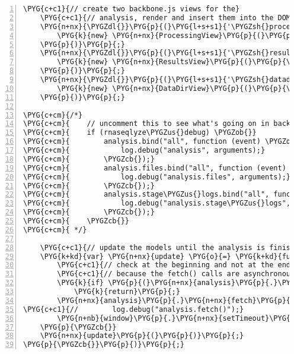 \begin{Verbatim}[commandchars=\\\{\},numbers=left,firstnumber=1,stepnumber=5]
    \PYG{c+c1}{// create two backbone.js views for the}
    \PYG{c+c1}{// analysis, render and insert them into the DOM}
    \PYG{n+nx}{\PYGZdl{}}\PYG{p}{(}\PYG{l+s+s1}{'\PYGZsh{}processing'}\PYG{p}{)}\PYG{p}{.}\PYG{n+nx}{html}\PYG{p}{(}
        \PYG{k}{new} \PYG{n+nx}{ProcessingView}\PYG{p}{(}\PYG{p}{\PYGZob{}}\PYG{n+nx}{model}\PYG{o}{:} \PYG{n+nx}{analysis}\PYG{p}{\PYGZcb{}}\PYG{p}{)}\PYG{p}{.}\PYG{n+nx}{render}\PYG{p}{(}\PYG{p}{)}\PYG{p}{.}\PYG{n+nx}{el}
    \PYG{p}{)}\PYG{p}{;}
    \PYG{n+nx}{\PYGZdl{}}\PYG{p}{(}\PYG{l+s+s1}{'\PYGZsh{}results'}\PYG{p}{)}\PYG{p}{.}\PYG{n+nx}{html}\PYG{p}{(}
        \PYG{k}{new} \PYG{n+nx}{ResultsView}\PYG{p}{(}\PYG{p}{\PYGZob{}}\PYG{n+nx}{model}\PYG{o}{:} \PYG{n+nx}{analysis}\PYG{p}{\PYGZcb{}}\PYG{p}{)}\PYG{p}{.}\PYG{n+nx}{render}\PYG{p}{(}\PYG{p}{)}\PYG{p}{.}\PYG{n+nx}{el}
    \PYG{p}{)}\PYG{p}{;}
    \PYG{n+nx}{\PYGZdl{}}\PYG{p}{(}\PYG{l+s+s1}{'\PYGZsh{}datadir'}\PYG{p}{)}\PYG{p}{.}\PYG{n+nx}{html}\PYG{p}{(}
        \PYG{k}{new} \PYG{n+nx}{DataDirView}\PYG{p}{(}\PYG{p}{\PYGZob{}}\PYG{n+nx}{model}\PYG{o}{:} \PYG{n+nx}{analysis}\PYG{p}{.}\PYG{n+nx}{files}\PYG{p}{\PYGZcb{}}\PYG{p}{)}\PYG{p}{.}\PYG{n+nx}{render}\PYG{p}{(}\PYG{p}{)}\PYG{p}{.}\PYG{n+nx}{el}
    \PYG{p}{)}\PYG{p}{;}

\PYG{c+cm}{/*}
\PYG{c+cm}{    // uncomment this to see what's going on in backbone.js}
\PYG{c+cm}{    if (rnaseqlyze\PYGZus{}debug) \PYGZob{}}
\PYG{c+cm}{        analysis.bind("all", function (event) \PYGZob{}}
\PYG{c+cm}{            log.debug("analysis", arguments);}
\PYG{c+cm}{        \PYGZcb{});}
\PYG{c+cm}{        analysis.files.bind("all", function (event) \PYGZob{}}
\PYG{c+cm}{            log.debug("analysis.files", arguments);}
\PYG{c+cm}{        \PYGZcb{});}
\PYG{c+cm}{        analysis.stage\PYGZus{}logs.bind("all", function (event) \PYGZob{}}
\PYG{c+cm}{            log.debug("analysis.stage\PYGZus{}logs", arguments);}
\PYG{c+cm}{        \PYGZcb{});}
\PYG{c+cm}{    \PYGZcb{}}
\PYG{c+cm}{ */}

    \PYG{c+c1}{// update the models until the analysis is finished}
    \PYG{k+kd}{var} \PYG{n+nx}{update} \PYG{o}{=} \PYG{k+kd}{function} \PYG{p}{(}\PYG{p}{)} \PYG{p}{\PYGZob{}}
        \PYG{c+c1}{// check at the beginning and not at the end}
        \PYG{c+c1}{// because the fetch() calls are asynchronous}
        \PYG{k}{if} \PYG{p}{(}\PYG{n+nx}{analysis}\PYG{p}{.}\PYG{n+nx}{attributes}\PYG{p}{.}\PYG{n+nx}{finished}\PYG{p}{)}
            \PYG{k}{return}\PYG{p}{;}
        \PYG{n+nx}{analysis}\PYG{p}{.}\PYG{n+nx}{fetch}\PYG{p}{(}\PYG{p}{)}\PYG{p}{;}
\PYG{c+c1}{//        log.debug("analysis.fetch()");}
        \PYG{n+nb}{window}\PYG{p}{.}\PYG{n+nx}{setTimeout}\PYG{p}{(}\PYG{n+nx}{update}\PYG{p}{,} \PYG{l+m+mi}{7000}\PYG{p}{)}\PYG{p}{;} \PYG{c+c1}{// re-update in 7 seconds}
    \PYG{p}{\PYGZcb{}}
    \PYG{n+nx}{update}\PYG{p}{(}\PYG{p}{)}\PYG{p}{;}
\PYG{p}{\PYGZcb{}}\PYG{p}{)}\PYG{p}{;}
\end{Verbatim}

